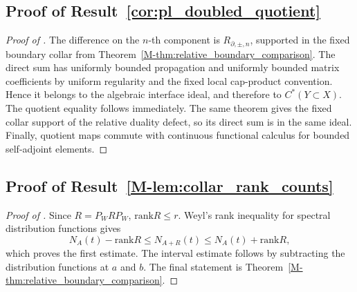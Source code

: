 \documentclass[11pt]{article}
\numberwithin{equation}{section}
\theoremstyle{definition}
\theoremstyle{remark}
\newcommand{\rank}{\mathrm{rank}}
\begin{document}
\subsection{Proof of Result~\ref{cor:pl_doubled_quotient}}\label{app:proof:cor:pl_doubled_quotient}
\begin{proof}[Proof of ]
The difference on the \(n\)-th component is \(R_{\partial,\pm,n}\), supported in the fixed boundary
collar from Theorem~\ref{M-thm:relative_boundary_comparison}. The direct sum has uniformly bounded
propagation and uniformly bounded matrix coefficients by uniform regularity and the fixed local
cap-product convention. Hence it belongs to the algebraic interface ideal, and therefore to
\(C^*(Y\subset X)\). The quotient equality follows immediately. The same theorem gives the fixed
collar support of the relative duality defect, so its direct sum is in the same ideal. Finally,
quotient maps commute with continuous functional calculus for bounded self-adjoint elements.
\end{proof}

\subsection{Proof of Result~\ref{M-lem:collar_rank_counts}}\label{app:proof:lem:collar_rank_counts}
\begin{proof}[Proof of ]
Since \(R=P_WRP_W\), \(\rank R\le r\). Weyl's rank inequality for spectral distribution
functions \cite[Chapter~III]{BhatiaMatrixAnalysis} gives
\[
N_A(t)-\rank R\le N_{A+R}(t)\le N_A(t)+\rank R,
\]
which proves the first estimate. The interval estimate follows by subtracting the distribution
functions at \(a\) and \(b\). The final statement is Theorem~\ref{M-thm:relative_boundary_comparison}.
\end{proof}
\end{document}
